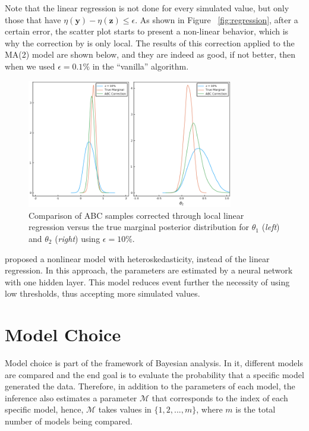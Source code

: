 \documentclass[runningheads]{llncs}
\begin{document}
Note that the linear regression is not done for every simulated
value, but only those that have
$\eta(\bm y) - \eta(\bm z) \leq \epsilon$. As
shown in 
Figure ~\ref{fig:regression}, after a certain error,
the scatter plot starts to present a non-linear behavior, which
is why the correction by \citet{Beaumont2012} is only local.
The results of this correction applied to the MA(2) model
are shown below, and they are indeed as good, if not better,
then when we used $\epsilon = 0.1\%$ in the ``vanilla'' algorithm.
\hfill\break
    \begin{figure}[H]
        \centering
        \includegraphics[width=9cm]{images/ABCRegression_Marginal.png}
        \caption{Comparison of ABC samples corrected through
        local linear regression versus the true marginal posterior
        distribution for $\theta_1$ (\textit{left}) and
        $\theta_2$ (\textit{right}) using $\epsilon = 10\%$.
        }
    \end{figure}

\citet{Blum2010}
proposed a nonlinear model with heteroskedasticity,
instead of the linear regression. In this approach,
the parameters are estimated by a neural network with
one hidden layer. This model reduces event further
the necessity of using low thresholds, thus accepting
more simulated values.

\section{Model Choice}
Model choice is part of the framework of Bayesian analysis.
In it, different models are compared and the end goal is
to evaluate the probability that a specific model generated the data.
Therefore, in addition to the parameters
of each model, the inference also estimates
a parameter
$\mathcal{M}$ that corresponds to the index of each specific
model, hence, $\mathcal{M}$ takes values in $\{1,2,...,m\}$, where
$m$ is the total number of models being compared.
\end{document}
